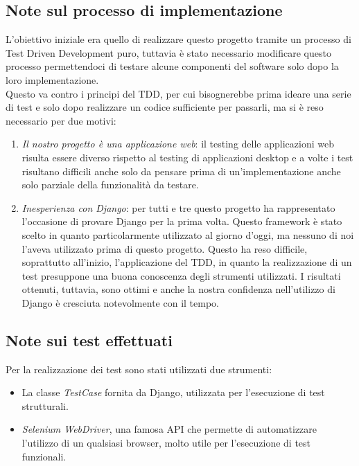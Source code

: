 \documentclass[10pt,a4paper]{report}
\begin{document}
	\subsection{Note sul processo di implementazione}
	L'obiettivo iniziale era quello di realizzare questo progetto tramite un processo di Test Driven Development puro, tuttavia è stato necessario modificare questo processo permettendoci di testare alcune componenti del software solo dopo la loro implementazione. \\
	Questo va contro i principi del TDD, per cui bisognerebbe prima ideare una serie di test e solo dopo realizzare un codice sufficiente per passarli, ma si è reso necessario per due motivi:
	\begin{enumerate}
		\item \textit{Il nostro progetto è una applicazione web}: il testing delle applicazioni web risulta essere diverso rispetto al testing di applicazioni desktop e a volte i test risultano difficili anche solo da pensare prima di un'implementazione anche solo parziale della funzionalità da testare.
		\item \textit{Inesperienza con Django}: per tutti e tre questo progetto ha rappresentato l'occasione di provare Django per la prima volta. Questo framework è stato scelto in quanto particolarmente utilizzato al giorno d'oggi, ma nessuno di noi l'aveva utilizzato prima di questo progetto. Questo ha reso difficile, soprattutto all'inizio, l'applicazione del TDD, in quanto la realizzazione di un test presuppone una buona conoscenza degli strumenti utilizzati. I risultati ottenuti, tuttavia, sono ottimi e anche la nostra confidenza nell'utilizzo di Django è cresciuta notevolmente con il tempo.
	\end{enumerate}

	\subsection{Note sui test effettuati}
	Per la realizzazione dei test sono stati utilizzati due strumenti:
	\begin{itemize}
		\item La classe \textit{TestCase} fornita da Django, utilizzata per l'esecuzione di test strutturali.
		\item \textit{Selenium WebDriver}, una famosa API che permette di automatizzare l'utilizzo di un qualsiasi browser, molto utile per l'esecuzione di test funzionali.
	\end{itemize}
\end{document}
